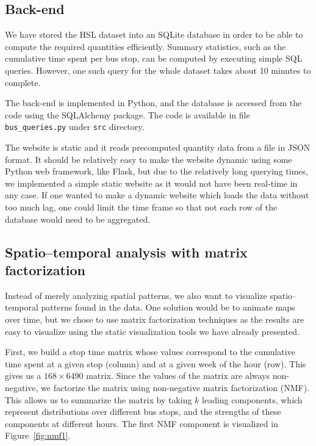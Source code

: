 \documentclass[a4paper,12pt]{article}
\begin{document}
\subsection{Back-end}

We have stored the HSL dataset into an SQLite database in order to be 
able to compute the required quantities efficiently. Summary statistics, such 
as the cumulative time spent per bus stop, can be computed by executing simple 
SQL queries. However, one such query for the whole dataset takes about 10 
minutes to complete.

The back-end is implemented in Python, and the database is accessed from the 
code using the SQLAlchemy package. The code is available in file 
\mbox{\texttt{bus\_queries.py}} under \texttt{src} directory.

The website is static and it reads precomputed quantity data from a file in 
JSON format. It should be relatively easy to make the website dynamic using 
some Python web framework, like Flask, but due to the relatively long querying 
times, we implemented a simple static website as it would not have been 
real-time in any case. If one wanted to make a dynamic website which loads the 
data without too much lag, one could limit the time frame so that not each row 
of the database would need to be aggregated.

\subsection{Spatio--temporal analysis with matrix factorization}

Instead of merely analyzing spatial patterns, we also want to visualize 
spatio--temporal patterns found in the data. One solution would be to animate 
maps over time, but we chose to use matrix factorization techniques as the 
results are easy to visualize using the static visualization tools we have
already presented.

First, we build a stop time matrix whose values correspond to the cumulative 
time spent at a given stop (column) and at a given week of the hour (row). This 
gives us a $168\times 6490$ matrix. Since the values of the matrix are always
non-negative, we factorize the matrix using non-negative matrix factorization 
(NMF). This allows us to summarize the matrix by taking $k$ leading components, 
which represent distributions over different bus stops, and the strengths 
of these components at different hours. The first NMF component is visualized 
in Figure~\ref{fig:nmf1}.
\end{document}
